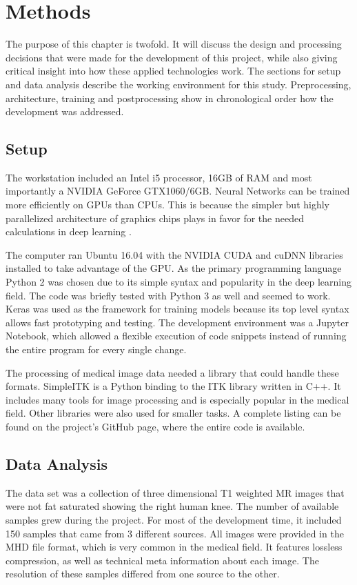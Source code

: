 \section{Methods}

The purpose of this chapter is twofold. It will discuss the design and processing decisions that were made for the development of this project, while also giving critical insight into how these applied technologies work. The sections for setup and data analysis describe the working environment for this study. Preprocessing, architecture, training and postprocessing show in chronological order how the development was addressed.

\subsection{Setup}

The workstation included an Intel i5 processor, 16GB of RAM and most importantly a NVIDIA GeForce GTX1060/6GB. Neural Networks can be trained more efficiently on GPUs than CPUs. This is because the simpler but highly parallelized architecture of graphics chips plays in favor for the needed calculations in deep learning \cite{NVIDIA}.

The computer ran Ubuntu 16.04 with the NVIDIA CUDA and cuDNN libraries installed to take advantage of the GPU. As the primary programming language Python 2 was chosen due to its simple syntax and popularity in the deep learning field. The code was briefly tested with Python 3 as well and seemed to work. Keras was used as the framework for training models because its top level syntax allows fast prototyping and testing. The development environment was a Jupyter Notebook, which allowed a flexible execution of code snippets instead of running the entire program for every single change.

The processing of medical image data needed a library that could handle these formats. SimpleITK is a Python binding to the ITK library written in C++. It includes many tools for image processing and is especially popular in the medical field. Other libraries were also used for smaller tasks. A complete listing can be found on the project's GitHub page, where the entire code is available.

\subsection{Data Analysis}

The data set was a collection of three dimensional T1 weighted MR images that were not fat saturated showing the right human knee. The number of available samples grew during the project. For most of the development time, it included 150 samples that came from 3 different sources. All images were provided in the MHD file format, which is very common in the medical field. It features lossless compression, as well as technical meta information about each image. The resolution of these samples differed from one source to the other.

